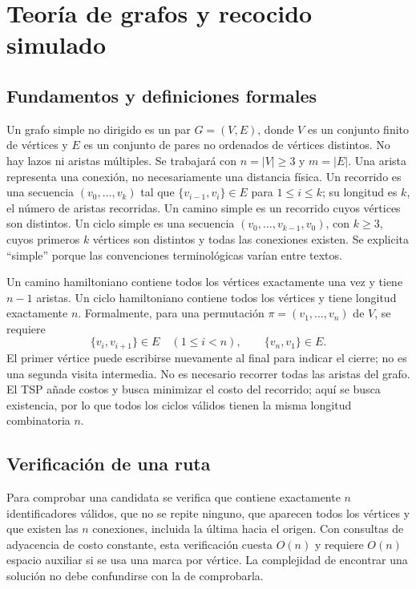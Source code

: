 \chapter{Teoría de grafos y recocido simulado}
\section{Fundamentos y definiciones formales}
Un grafo simple no dirigido es un par $G=(V,E)$, donde $V$ es un conjunto finito de vértices y $E$ es un conjunto de pares no ordenados de vértices distintos. No hay lazos ni aristas múltiples. Se trabajará con $n=|V|\geq3$ y $m=|E|$. Una arista representa una conexión, no necesariamente una distancia física. Un recorrido es una secuencia $(v_0,\ldots,v_k)$ tal que $\{v_{i-1},v_i\}\in E$ para $1\leq i\leq k$; su longitud es $k$, el número de aristas recorridas. Un camino simple es un recorrido cuyos vértices son distintos. Un ciclo simple es una secuencia $(v_0,\ldots,v_{k-1},v_0)$, con $k\geq3$, cuyos primeros $k$ vértices son distintos y todas las conexiones existen. Se explicita ``simple'' porque las convenciones terminológicas varían entre textos.\cite{sa1,sa2}

Un camino hamiltoniano contiene todos los vértices exactamente una vez y tiene $n-1$ aristas. Un ciclo hamiltoniano contiene todos los vértices y tiene longitud exactamente $n$. Formalmente, para una permutación $\pi=(v_1,\ldots,v_n)$ de $V$, se requiere
\[
\{v_i,v_{i+1}\}\in E\quad(1\leq i<n),\qquad \{v_n,v_1\}\in E.
\]
El primer vértice puede escribirse nuevamente al final para indicar el cierre; no es una segunda visita intermedia. No es necesario recorrer todas las aristas del grafo. El TSP añade costos y busca minimizar el costo del recorrido; aquí se busca existencia, por lo que todos los ciclos válidos tienen la misma longitud combinatoria $n$.\cite{sa2,sa3}

\section{Verificación de una ruta}
Para comprobar una candidata se verifica que contiene exactamente $n$ identificadores válidos, que no se repite ninguno, que aparecen todos los vértices y que existen las $n$ conexiones, incluida la última hacia el origen. Con consultas de adyacencia de costo constante, esta verificación cuesta $O(n)$ y requiere $O(n)$ espacio auxiliar si se usa una marca por vértice. La complejidad de encontrar una solución no debe confundirse con la de comprobarla.

